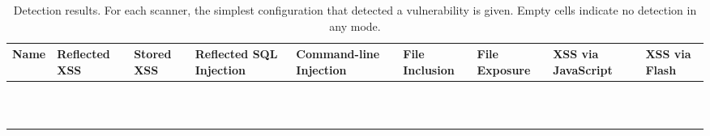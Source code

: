   \begin{table}[t]
    \centering
    {\scriptsize
      \begin{tabular}{|l|p{11ex}|p{11ex}|p{11ex}|p{11ex}|p{11ex}|p{11ex}|p{11ex}|p{11ex}|}
        \hline
        Name & Reflected XSS  & Stored XSS & \parbox[t]{11ex}{\raggedright Reflected SQL Injection} & \parbox[t]{11ex}{\raggedright Command-line Injection } & \parbox[t]{11ex}{\raggedright File Inclusion } & \parbox[t]{11ex}{\raggedright File Exposure } & \parbox[t]{11ex}{\raggedright XSS via JavaScript } & \parbox[t]{11ex}{\raggedright XSS via Flash }\\
        \hline
        \acunetix{} & \initial{} & \initial{} & \initial{} &  & \initial{} & \initial{} & \initial{} & \\
        \appscan{} & \initial{} & \initial{} & \initial{} &  & \initial{} & \initial{} &  &  \\
        \burp{} & \initial{} & \manual{} & \initial{} & \initial{} &  & \initial{} &  & \manual{} \\
        \grendelscan{} & \manual{} &  & \config{} &  &  &  &  &  \\
        \hailstorm{} & \initial{} & \config{} & \config{} &  &  &  &  & \manual{} \\
        \milescan{} & \initial{} & \manual{} & \config{} &  &  &  &  &  \\
        \nstalker{} & \initial{} & \manual{} & \manual{} &  &  & \initial{} & \initial{} & \manual{} \\
        \ntospider{} & \initial{} & \initial{} & \initial{} &  &  &  &  &  \\
        \paros{} & \initial{} & \initial{} & \config{} &  &  &  &  & \manual{} \\
        \waf{} & \initial{} & \manual{} & \initial{} &  & \initial{} &  &  & \manual{} \\
        \webinspect{} & \initial{} & \initial{} & \initial{} &  & \initial{} &  & \initial{} & \manual{} \\
        \hline
    \end{tabular}}
    \caption{Detection results. For each scanner, the simplest configuration that detected a vulnerability is given. Empty cells indicate no detection in any mode.}
    \label{results}

\end{table}
